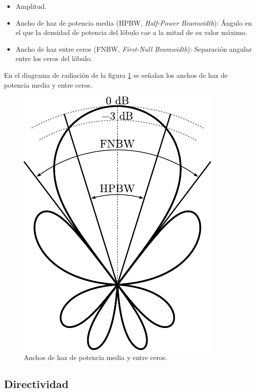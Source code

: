 \begin{itemize}
\item Amplitud.
\item Ancho de haz de potencia media (HPBW, \emph{Half-Power Beamwidth}): Ángulo en el que la densidad de potencia del lóbulo cae a la mitad de su valor máximo.
\item Ancho de haz entre ceros (FNBW, \emph{First-Null Beamwidth}): Separación angular entre los ceros del lóbulo.
\end{itemize}
En el diagrama de radiación de la figura \ref{fig_intro:3} se señalan los anchos de haz de potencia media y entre ceros.
\begin{figure} [H]
\centering 
\includegraphics[scale = 1]{Figures/Intro/intro_3.pdf}
\caption{Anchos de haz de potencia media y entre ceros.}
\label{fig_intro:3}
\end{figure}

\subsection{Directividad}
\label{subsec_intro_direc}

